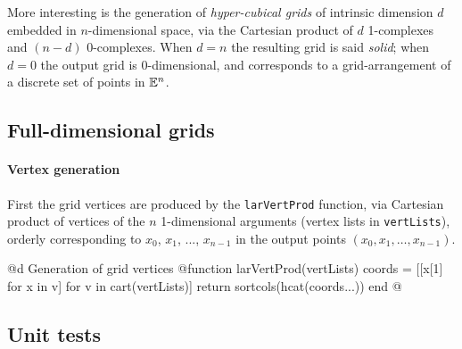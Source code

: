 More interesting is the generation of \emph{hyper-cubical grids} of intrinsic dimension $d$ embedded in $n$-dimensional space, via the Cartesian product of $d$ 1-complexes and $(n-d)$ 0-complexes. When $d=n$ the resulting grid is said \emph{solid}; when $d=0$ the output grid is 0-dimensional, and corresponds to a grid-arrangement of a discrete set of points in $\mathbb{E}^n$.


\subsection{Full-dimensional grids}

\paragraph{Vertex generation}
First the grid vertices are produced by the \texttt{larVertProd} function, via Cartesian product of vertices of the $n$ 1-dimensional arguments (vertex lists in \texttt{vertLists}), orderly corresponding to $x_0$, $x_1$, ..., $x_{n-1}$ in the output points $(x_0, x_1,\ldots,x_{n-1})$.

@d Generation of grid vertices 
@{function larVertProd(vertLists)
	coords = [[x[1] for x in v] for v in cart(vertLists)]
   return sortcols(hcat(coords...))
end
@}


\subsection{Unit tests}

